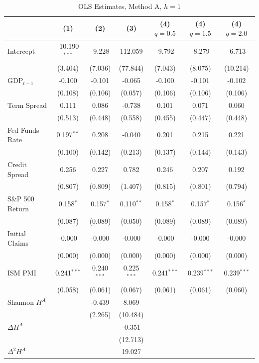 \begin{table}[htbp]
\centering
\caption{OLS Estimates, Method A, $h = 1$}
\label{tab:ols_coef_A_h1}
\footnotesize
\begin{tabular}{lcccccc}
\toprule
 & (1) & (2) & (3) & (4) $q\!=\!0.5$ & (4) $q\!=\!1.5$ & (4) $q\!=\!2.0$ \\
\midrule
  Intercept & -10.190$^{***}$ & -9.228 & 112.059 & -9.792 & -8.279 & -6.713 \\
  & (3.404) & (7.036) & (77.844) & (7.043) & (8.075) & (10.214) \\[2pt]
  GDP$_{t-1}$ & -0.100 & -0.101 & -0.065 & -0.100 & -0.101 & -0.102 \\
  & (0.108) & (0.106) & (0.057) & (0.106) & (0.106) & (0.106) \\[2pt]
  Term Spread & 0.111 & 0.086 & -0.738 & 0.101 & 0.071 & 0.060 \\
  & (0.513) & (0.448) & (0.558) & (0.455) & (0.447) & (0.448) \\[2pt]
  Fed Funds Rate & 0.197$^{**}$ & 0.208 & -0.040 & 0.201 & 0.215 & 0.221 \\
  & (0.100) & (0.142) & (0.213) & (0.137) & (0.144) & (0.143) \\[2pt]
  Credit Spread & 0.256 & 0.227 & 0.782 & 0.246 & 0.207 & 0.192 \\
  & (0.807) & (0.809) & (1.407) & (0.815) & (0.801) & (0.794) \\[2pt]
  S\&P 500 Return & 0.158$^{*}$ & 0.157$^{*}$ & 0.110$^{**}$ & 0.158$^{*}$ & 0.157$^{*}$ & 0.156$^{*}$ \\
  & (0.087) & (0.089) & (0.050) & (0.089) & (0.089) & (0.089) \\[2pt]
  Initial Claims & -0.000 & -0.000 & -0.000 & -0.000 & -0.000 & -0.000 \\
  & (0.000) & (0.000) & (0.000) & (0.000) & (0.000) & (0.000) \\[2pt]
  ISM PMI & 0.241$^{***}$ & 0.240$^{***}$ & 0.225$^{***}$ & 0.241$^{***}$ & 0.239$^{***}$ & 0.239$^{***}$ \\
  & (0.058) & (0.061) & (0.067) & (0.061) & (0.061) & (0.060) \\[2pt]
  Shannon $H^A$ &  & -0.439 & 8.069 &  &  &  \\
  &  & (2.265) & (10.484) &  &  &  \\[2pt]
  $\Delta H^A$ &  &  & -0.351 &  &  &  \\
  &  &  & (12.713) &  &  &  \\[2pt]
  $\Delta^2 H^A$ &  &  & 19.027 &  &  &  \\

\end{tabular}
\end{table}
